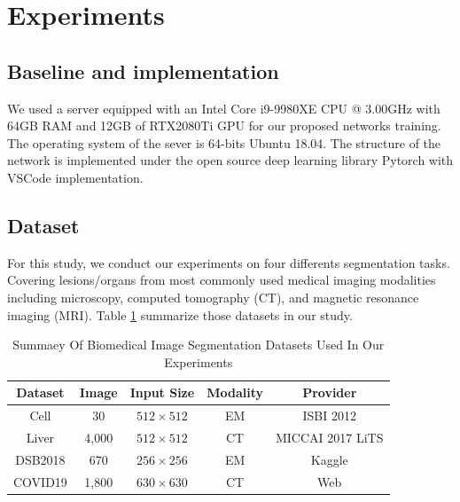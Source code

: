 \documentclass[UTF8]{article} %
\begin{document}
\section{Experiments}
\subsection{Baseline and implementation}
We used a server equipped with an Intel Core i9-9980XE CPU @ 3.00GHz with 64GB RAM and 12GB of RTX2080Ti GPU for
our proposed networks training. The operating system of the sever is 64-bits Ubuntu 18.04. The structure of the network 
is implemented under the open source deep learning library Pytorch with VSCode implementation.

\subsection{Dataset}
For this study, we conduct our experiments on four differents segmentation tasks. 
Covering lesions/organs from most commonly used medical imaging modalities including microscopy, 
computed tomography (CT), and magnetic resonance imaging (MRI).  Table \ref{dataset-table} summarize those datasets in our study.

\begin{table}[ht]
  \vspace{-2mm}
  \begin{center}\small
  \label{dataset-table}
  \begin{tabular}{ccccc}
    
  \toprule
  Dataset & Image & Input Size & Modality & Provider\\
  \midrule
  Cell & 30 & $512\times 512$  & EM      & ISBI 2012\cite{isbicell}   \\
  Liver    & 4,000 & $512\times 512$       & CT     & MICCAI 2017 LiTS\cite{liver}  \\
  DSB2018      & 670 & $256\times 256$      & EM      & Kaggle\cite{dsb2018} \\
  COVID19         & 1,800 & $630\times 630$     & CT     & Web\cite{covid19,covid19_2}  \\
\bottomrule    
  \end{tabular}
  \caption{Summaey Of Biomedical Image Segmentation Datasets Used In Our Experiments}
\end{center}
  \vspace{-4mm}
  \end{table}
\end{document}
